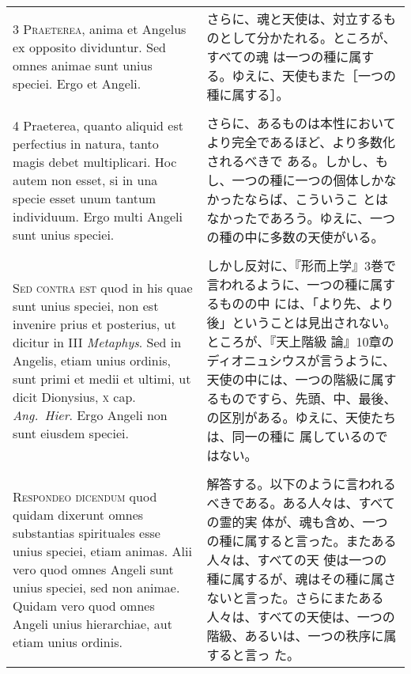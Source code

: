 \documentclass[10pt]{jsarticle} %
\begin{document}
\begin{longtable}{p{21em}p{21em}}
{\scshape 3 Praeterea}, anima et Angelus ex opposito
dividuntur. Sed omnes animae sunt unius speciei. Ergo et Angeli.

&

さらに、魂と天使は、対立するものとして分かたれる。ところが、すべての魂
 は一つの種に属する。ゆえに、天使もまた［一つの種に属する］。

\\\\


4 Praeterea, quanto aliquid est perfectius in
natura, tanto magis debet multiplicari. Hoc autem non esset, si in una
specie esset unum tantum individuum. Ergo multi Angeli sunt unius
speciei.


&


さらに、あるものは本性においてより完全であるほど、より多数化されるべきで
 ある。しかし、もし、一つの種に一つの個体しかなかったならば、こういうこ
 とはなかったであろう。ゆえに、一つの種の中に多数の天使がいる。

 \\\\

 {\scshape Sed contra est} quod in his quae sunt unius speciei, non
est invenire prius et posterius, ut dicitur in III {\itshape
Metaphys}. Sed in Angelis, etiam unius ordinis, sunt primi et medii et
ultimi, ut dicit Dionysius, {\scshape x} cap.~{\itshape
Ang.~Hier}. Ergo Angeli non sunt eiusdem speciei.


&

 しかし反対に、『形而上学』3巻で言われるように、一つの種に属するものの中
 には、「より先、より後」ということは見出されない。ところが、『天上階級
 論』10章のディオニュシウスが言うように、天使の中には、一つの階級に属す
 るものですら、先頭、中、最後、の区別がある。ゆえに、天使たちは、同一の種に
 属しているのではない。


\\\\



 {\scshape Respondeo dicendum} quod quidam dixerunt omnes substantias
 spirituales esse unius speciei, etiam animas. Alii vero quod omnes
 Angeli sunt unius speciei, sed non animae. Quidam vero quod omnes
 Angeli unius hierarchiae, aut etiam unius ordinis.



&

 解答する。以下のように言われるべきである。ある人々は、すべての霊的実
 体が、魂も含め、一つの種に属すると言った。またある人々は、すべての天
 使は一つの種に属するが、魂はその種に属さないと言った。さらにまたある
 人々は、すべての天使は、一つの階級、あるいは、一つの秩序に属すると言っ
 た。



\end{longtable}
\end{document}

